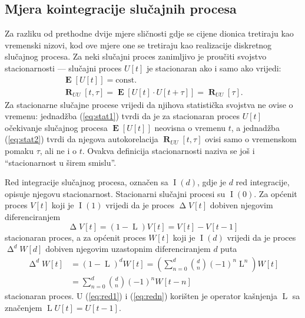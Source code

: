 \documentclass[lmodern, utf8, diplomski, numeric]{fer}
\newcommand{\E}[1]{\operatorname{\mathbf{E}}\q[#1\w]}
\newcommand{\R}[2]{\operatorname{\mathbf{R}}_{#1}\q[#2\w]}
\newcommand{\I}[1]{\operatorname{\mathrm{I}}\q(#1\w)}
\newcommand{\diff}{\operatorname{\mathrm{\Delta}}}
\newcommand{\diffn}[1]{\operatorname{\mathrm{\Delta}}^d}
\newcommand{\lag}{\operatorname{\mathrm{L}}}
\newcommand{\q}{\left}
\newcommand{\w}{\right}
\begin{document}
  \subsection{Mjera kointegracije slučajnih procesa}
  Za razliku od prethodne dvije mjere sličnosti gdje se cijene dionica tretiraju kao vremenski nizovi, kod ove mjere one se tretiraju kao realizacije diskretnog slučajnog procesa.
  Za neki slučajni proces zanimljivo je proučiti svojstvo stacionarnosti --- slučajni proces $U\q[t\w]$ je stacionaran ako i samo ako vrijedi:
  \begin{gather}
  \label{eq:stat1}
  \E{U\q[t\w]} = \mathrm{const.}\\
  \label{eq:stat2}
  \R{UU}{t, \tau} = \E{U\q[t\w] \cdot U\q[t + \tau\w]} = \R{UU}{\tau}.
  \end{gather}
  Za stacionarne slučajne procese vrijedi da njihova statistička svojstva ne ovise o vremenu:
  jednadžba (\ref{eq:stat1}) tvrdi da je za stacionaran proces $U\q[t\w]$ očekivanje slučajnog procesa $\E{U\q[t\w]}$ neovisna o vremenu $t$, a jednadžba (\ref{eq:stat2}) tvrdi da njegova autokorelacija $\R{UU}{t, \tau}$ ovisi samo o vremenskom pomaku $\tau$, ali ne i o $t$.
  Ovakva definicija stacionarnosti naziva se još i ``stacionarnost u širem smislu''.
  
  Red integracije slučajnog procesa, označen sa $\I{d}$, gdje je $d$ red integracije, opisuje njegovu stacionarnost.
  Stacionarni slučajni procesi su $\I{0}$.
  Za općenit proces $V\q[t\w]$ koji je $\I{1}$ vrijedi da je proces $\diff V\q[t\w]$ dobiven njegovim diferenciranjem
  \begin{equation}
  \label{eq:red1}
  \diff V\q[t\w] = \q(1 - \lag\w) V\q[t\w] = V\q[t\w] - V\q[t - 1\w]
  \end{equation}
  stacionaran proces, a za općenit proces $W\q[t\w]$ koji je $\I{d}$ vrijedi da je proces $\diffn{d} W\q[d\w]$ dobiven njegovim uzastopnim diferenciranjem $d$ puta
  \begin{align}
  \diffn{d} W\q[t\w] &= \q(1 - \lag\w)^d W\q[t\w] = \q( \sum_{n = 0}^{d} \binom{d}{n} \q(-1\w)^n\lag^n \w) W\q[t\w] \nonumber \\
  \label{eq:redn}
  &= \sum_{n = 0}^{d} \binom{d}{n} \q(-1\w)^n W\q[t - n\w]
  \end{align}
  stacionaran proces.
  U (\ref{eq:red1}) i (\ref{eq:redn}) korišten je operator kašnjenja $\lag$ sa značenjem $\lag U\q[t\w] = U\q[t - 1\w]$.
  
\end{document}

